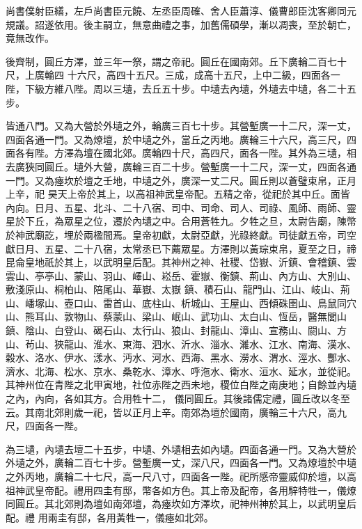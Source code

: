 \begin{pinyinscope}
 尚書僕射臣繕，左戶尚書臣元饒、左丞臣周確、舍人臣蕭淳、儀曹郎臣沈客卿同元規議。詔遂依用。後主嗣立，無意曲禮之事，加舊儒碩學，漸以凋喪，至於朝亡，竟無改作。



 後齊制，圓丘方澤，並三年一祭，謂之帝祀。圓丘在國南郊。丘下廣輪二百七十尺，上廣輪四
 十六尺，高四十五尺。三成，成高十五尺，上中二級，四面各一陛，下級方維八陛。周以三壝，去丘五十步。中壝去內壝，外壝去中壝，各二十五步。



 皆通八門。又為大營於外壝之外，輪廣三百七十步。其營塹廣一十二尺，深一丈，四面各通一門。又為燎壇，於中壝之外，當丘之丙地。廣輪三十六尺，高三尺，四面各有陛。方澤為壇在國北郊。廣輪四十尺，高四尺，面各一陛。其外為三壝，相去廣狹同圓丘。壝外大營，廣輪三百二十步。營塹廣一十二尺，深一丈，四面各通一門。又為瘞坎於壇之壬地，中壝之外，廣深一丈二尺。圓丘則以蒼璧束帛，正月上辛，祀
 昊天上帝於其上，以高祖神武皇帝配。五精之帝，從祀於其中丘。面皆內向。日月、五星、北斗、二十八宿、司中、司命、司人、司祿、風師、雨師、靈星於下丘，為眾星之位，遷於內壝之中。合用蒼牲九。夕牲之旦，太尉告廟，陳幣於神武廟訖，埋於兩楹間焉。皇帝初獻，太尉亞獻，光祿終獻。司徒獻五帝，司空獻日月、五星、二十八宿，太常丞已下薦眾星。方澤則以黃琮束帛，夏至之日，禘昆侖皇地祇於其上，以武明皇后配。其神州之神、社稷、岱嶽、沂鎮、會稽鎮、雲雲山、亭亭山、蒙山、羽山、嶧山、崧岳、霍嶽、衡鎮、荊山、內方山、大別山、敷淺原山、桐柏山、陪尾山、華嶽、太嶽
 鎮、積石山、龍門山、江山、岐山、荊山、嶓塚山、壺口山、雷首山、底柱山、析城山、王屋山、西傾硃圉山、鳥鼠同穴山、熊耳山、敦物山、蔡蒙山、梁山、岷山、武功山、太白山、恆岳，醫無閭山鎮、陰山、白登山、碣石山、太行山、狼山、封龍山、漳山、宣務山、閼山、方山、茍山、狹龍山、淮水、東海、泗水、沂水、淄水、濰水、江水、南海、漢水、穀水、洛水、伊水、漾水、沔水、河水、西海、黑水、澇水、渭水、涇水、酆水、濟水、北海、松水、京水、桑乾水、漳水、呼沲水、衛水、洹水、延水，並從祀。其神州位在青陛之北甲寅地，社位赤陛之西未地，稷位白陛之南庚地；自餘並內壝之內，內向，各如其方。合用牲十二，
 儀同圓丘。其後諸儒定禮，圓丘改以冬至云。其南北郊則歲一祀，皆以正月上辛。南郊為壇於國南，廣輪三十六尺，高九尺，四面各一陛。



 為三壝，內壝去壇二十五步，中壝、外壝相去如內壝。四面各通一門。又為大營於外壝之外，廣輪二百七十步。營塹廣一丈，深八尺，四面各一門。又為燎壇於中壝之外丙地，廣輪二十七尺，高一尺八寸，四面各一陛。祀所感帝靈威仰於壇，以高祖神武皇帝配。禮用四圭有邸，幣各如方色。其上帝及配帝，各用騂特牲一，儀燎同圓丘。其北郊則為壇如南郊壇，為瘞坎如方澤坎，祀神州神於其上，以武明皇后配。禮
 用兩圭有邸，各用黃牲一，儀瘞如北郊。




\end{pinyinscope}
